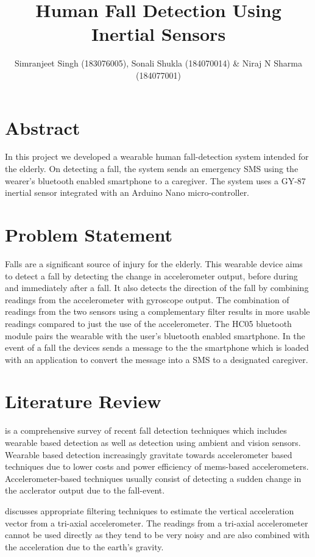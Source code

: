 \documentclass[11pt, a4paper]{article}
\title{Human Fall Detection Using Inertial Sensors}
\author{Simranjeet Singh (183076005), Sonali Shukla (184070014) \& Niraj N Sharma (184077001)}
\begin{document}
\maketitle
\section*{Abstract}
In this project we developed a wearable human fall-detection system
intended for the elderly. On detecting a fall, the system sends an
emergency SMS using the wearer's bluetooth enabled smartphone to a
caregiver. The system uses a GY-87 inertial sensor integrated with an
Arduino Nano micro-controller.

\section{Problem Statement}
Falls are a significant source of injury for the elderly. This wearable
device aims to detect a fall by detecting the change in accelerometer
output, before during and immediately after a fall. It also detects the
direction of the fall by combining readings from the accelerometer with
gyroscope output. The combination of readings from the two sensors using a
complementary filter results in more usable readings compared to
just the use of the accelerometer. The HC05 bluetooth module pairs the
wearable with the user's bluetooth enabled smartphone. In the event of a
fall the devices sends a message to the the smartphone which is loaded
with an application to convert the message into a SMS to a designated
caregiver.

\section{Literature Review}
\cite{Mubashir2013} is a comprehensive survey of recent fall detection
techniques which includes wearable based detection as well as detection
using ambient and vision sensors. Wearable based detection increasingly
gravitate towards accelerometer based techniques due to lower costs and
power efficiency of mems-based accelerometers. Accelerometer-based techniques usually consist of detecting a sudden change in the
acclerator output due to the fall-event.

\cite{Bourke2011} discusses appropriate filtering techniques to estimate
the vertical acceleration vector from a tri-axial accelerometer. The
readings from a tri-axial accelerometer cannot be used directly as they
tend to be very noisy and are also combined with the acceleration due to
the earth's gravity.
\end{document}
